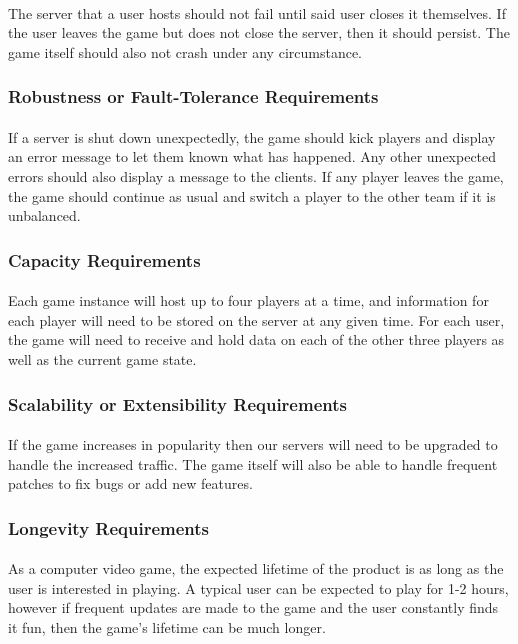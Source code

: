 \documentclass[12pt, titlepage]{article}
\begin{document}
\paragraph{}The server that a user hosts should not fail until said user closes it themselves. If the user leaves the game but does not close the server, then it should persist. The game itself should also not crash under any circumstance.
\subsubsection{Robustness or Fault-Tolerance Requirements}
\paragraph{}If a server is shut down unexpectedly, the game should kick players and display an error message to let them known what has happened. Any other unexpected errors should also display a message to the clients. If any player leaves the game, the game should continue as usual and switch a player to the other team if it is unbalanced.  
\subsubsection{Capacity Requirements}
\paragraph{}Each game instance will host up to four players at a time, and information for each player will need to be stored on the server at any given time. For each user, the game will need to receive and hold data on each of the other three players as well as the current game state. 
\subsubsection{Scalability or Extensibility Requirements}
\paragraph{}If the game increases in popularity then our servers will need to be upgraded to handle the increased traffic. The game itself will also be able to handle frequent patches to fix bugs or add new features. 
\subsubsection{Longevity Requirements}
\paragraph{}As a computer video game, the expected lifetime of the product is as long as the user is interested in playing. A typical user can be expected to play for 1-2 hours, however if frequent updates are made to the game and the user constantly finds it fun, then the game's lifetime can be much longer. 
\end{document}
